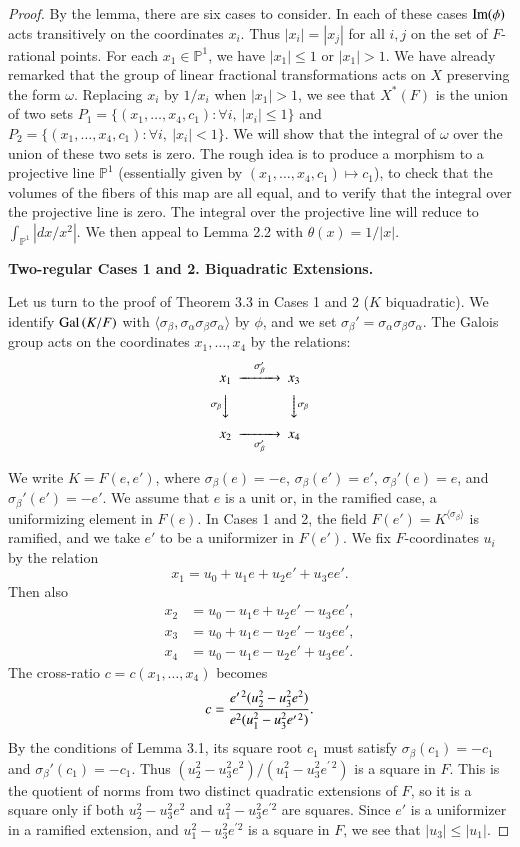 \documentclass{amsart}
\newcommand\bP{{\mathbb P}}
\newcommand\Gal{\hbox{Gal\,}}
\newcommand\Ima{\hbox{Im}}
\begin{document}
\medskip
\noindent
\begin{proof}    By the lemma, there are six cases to consider.  In
each of these cases $\Ima(\phi)$ acts transitively on the
coordinates $x_i$.  Thus $|x_i|=|x_j|$ for all $i,j$ on the set
of $F$-rational points.  For each $x_1\in\bP^1$, we have
$|x_1|\le 1$ or $|x_1|>1$.  We have already remarked that
the group of linear fractional transformations acts on $X$
preserving the form $\omega$.  Replacing $x_i$ by $1/x_i$
when $|x_1|>1$, we see that $X^*(F)$ is the union of two sets
$P_1=\{ (x_1,\ldots,x_4,c_1) : \forall i,\ |x_i|\le 1\}$
and $P_2=\{ (x_1,\ldots,x_4,c_1) : \forall i, \ |x_i|<1\}$.
We will show that the integral of $\omega$ over the
union of these two
sets is zero.  The rough idea is to produce a morphism 
to a projective line $\bP^1$
(essentially given by $(x_1,\ldots,x_4,c_1)\mapsto c_1$),
to check that the volumes of the fibers of this map are all equal,
and to verify that the integral over the projective line
is zero.  The integral over the projective line will reduce to
$\int_{\bP^1}|dx/x^2|$.  We then appeal to Lemma 2.2 with
$\theta(x) = 1/|x|$.


\bigskip
\centerline{\bf Two-regular Cases 1 and 2. Biquadratic Extensions.}
\bigskip

Let us turn to the proof of Theorem 3.3
in Cases 1 and 2 ($K$ biquadratic).  We identify
$\Gal(K/F)$ with $\langle\sigma_\beta,\sigma_\alpha\sigma_\beta\sigma_\alpha
\rangle$ by $\phi$, and we set $\sigma_\beta' = \sigma_\alpha\sigma_\beta
\sigma_\alpha$.  The Galois group acts on the coordinates
$x_1,\ldots,x_4$ by the relations:
$$\CD
x_1 @>\sigma_\beta'>> x_3 \\
@V\sigma_\beta VV       @VV\sigma_\beta V \\
x_2 @>>\sigma_\beta'> x_4 
\endCD
$$

We write $K=F(e,e')$, where $\sigma_\beta(e)=-e$, $\sigma_\beta(e')=e'$,
$\sigma_\beta'(e) = e$, and $\sigma_\beta'(e')=-e'$.  We assume
that $e$ is a unit or, in the ramified case, a 
uniformizing element
in $F(e)$.  In Cases 1 and
2, the field $F(e') = K^{\langle\sigma_\beta\rangle}$ is ramified,
and we take $e'$ to be a uniformizer in $F(e')$.   We fix $F$-coordinates
$u_i$ by the relation
$$x_1 = u_0 + u_1 e + u_2 e' + u_3 e e'.$$
Then also
\begin{align*} x_2 &= u_0 - u_1 e + u_2 e' - u_3 e e',\\
         x_3 &= u_0 + u_1 e - u_2 e' - u_3 e e',\\
         x_4 &= u_0 - u_1 e - u_2 e' + u_3 e e'.
\end{align*}
The cross-ratio $c=c(x_1,\ldots,x_4)$ becomes
$$c= { e^{\prime\,2}(u_2^2-u_3^2 e^2)\over e^2 (u_1^2-u_3^2 e^{\prime\,2})}.$$
By the conditions of Lemma 3.1,
its square root $c_1$ must satisfy $\sigma_\beta(c_1)=-c_1$ and
$\sigma_\beta'(c_1)=-c_1$.  Thus
$(u_2^2-u_3^2 e^2)/(u_1^2-u_3^2 e^{\prime\,2})$ is a square in $F$.
This is the quotient of norms from two distinct quadratic extensions
of $F$, so it is a square only if both 
$u_2^2-u_3^2 e^2$ and $u_1^2-u_3^2 e^{\prime 2}$
are squares.  Since $e'$ is a uniformizer in a ramified extension,
and
$u_1^2-u_3^2e^{\prime 2}$ is a square in $F$, we see that $|u_3|\le |u_1|$.


\end{proof}
\end{document}
